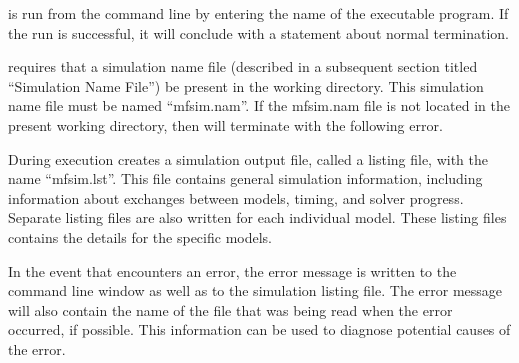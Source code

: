 \mf is run from the command line by entering the name of the \mf executable program.  If the run is successful, it will conclude with a statement about normal termination.



\noindent \mf requires that a simulation name file (described in a subsequent section titled ``Simulation Name File'') be present in the working directory.  This simulation name file must be named ``mfsim.nam''.  If the mfsim.nam file is not located in the present working directory, then \mf will terminate with the following error.  



During execution \mf creates a simulation output file, called a listing file, with the name ``mfsim.lst''.  This file contains general simulation information, including information about exchanges between models, timing, and solver progress.  Separate listing files are also written for each individual model.  These listing files contains the details for the specific models.

In the event that \mf encounters an error, the error message is written to the command line window as well as to the simulation listing file.  The error message will also contain the name of the file that was being read when the error occurred, if possible.  This information can be used to diagnose potential causes of the error.  
